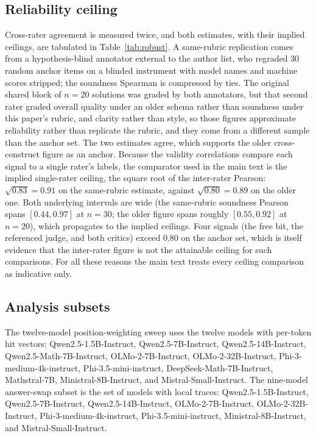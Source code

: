 \subsection{Reliability ceiling}
\label{app:ceiling}
Cross-rater agreement is measured twice, and both estimates, with their implied ceilings, are tabulated in Table~\ref{tab:robust}.
A same-rubric replication comes from a hypothesis-blind annotator external to the author list, who regraded 30 random anchor items on a blinded instrument with model names and machine scores stripped; the soundness Spearman is compressed by ties.
The original shared block of $n{=}20$ solutions was graded by both annotators, but that second rater graded overall quality under an older schema rather than soundness under this paper's rubric, and clarity rather than style, so those figures approximate reliability rather than replicate the rubric, and they come from a different sample than the anchor set.
The two estimates agree, which supports the older cross-construct figure as an anchor.
Because the validity correlations compare each signal to a single rater's labels, the comparator used in the main text is the implied single-rater ceiling, the square root of the inter-rater Pearson: $\sqrt{0.83} = 0.91$ on the same-rubric estimate, against $\sqrt{0.80} = 0.89$ on the older one.
Both underlying intervals are wide (the same-rubric soundness Pearson spans $[0.44, 0.97]$ at $n{=}30$; the older figure spans roughly $[0.55, 0.92]$ at $n{=}20$), which propagates to the implied ceilings.
Four signals (the free bit, the referenced judge, and both critics) exceed $0.80$ on the anchor set, which is itself evidence that the inter-rater figure is not the attainable ceiling for such comparisons.
For all these reasons the main text treats every ceiling comparison as indicative only.

\subsection{Analysis subsets}
\label{app:subsets}
\begingroup
\sloppy
The twelve-model position-weighting sweep uses the twelve models with per-token hit vectors: Qwen2.5-1.5B-Instruct, Qwen2.5-7B-Instruct, Qwen2.5-14B-Instruct, Qwen2.5-Math-7B-Instruct, OLMo-2-7B-Instruct, OLMo-2-32B-Instruct, Phi-3-medium-4k-instruct, Phi-3.5-mini-instruct, DeepSeek-Math-7B-Instruct, Mathstral-7B, Ministral-8B-Instruct, and Mistral-Small-Instruct.
The nine-model answer-swap subset is the set of models with local traces: Qwen2.5-1.5B-Instruct, Qwen2.5-7B-Instruct, Qwen2.5-14B-Instruct, OLMo-2-7B-Instruct, OLMo-2-32B-Instruct, Phi-3-medium-4k-instruct, Phi-3.5-mini-instruct, Ministral-8B-Instruct, and Mistral-Small-Instruct.
\par
\endgroup

